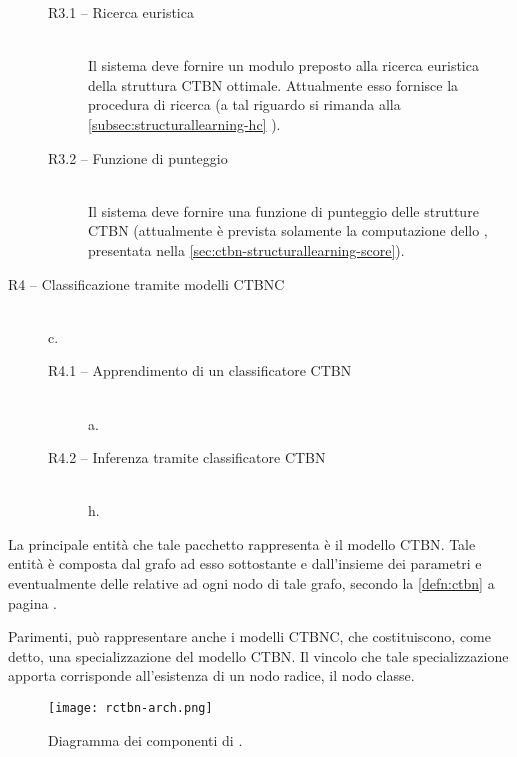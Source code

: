 \begin{description}
		\begin{description}
			\item[R3.1 -- Ricerca euristica] \hfill \\
			Il sistema deve fornire un modulo preposto alla ricerca euristica della struttura \acs{CTBN} ottimale. Attualmente esso fornisce la procedura di ricerca \emph{\keyword{\hc{}}} (a tal riguardo si rimanda alla \autoref{subsec:structurallearning-hc} ).
			\item[R3.2 -- Funzione di punteggio] \hfill \\
			Il sistema deve fornire una funzione di punteggio delle strutture \acs{CTBN} (attualmente è prevista solamente la computazione dello \emph{}, presentata nella \vref{sec:ctbn-structurallearning-score}).
		\end{description}
	\item[R4 -- Classificazione tramite modelli CTBNC] \hfill \\
	c.
		\begin{description}
		\item[R4.1 -- Apprendimento di un classificatore \acs{CTBN}] \hfill \\
		a.
		\item[R4.2 -- Inferenza tramite classificatore \acs{CTBN}] \hfill \\
		h.
		\end{description}
\end{description}

La principale entità che tale pacchetto rappresenta è il modello \acs{CTBN}. Tale entità è composta dal grafo ad esso sottostante e dall'insieme dei parametri e eventualmente delle \im{} relative ad ogni nodo di tale grafo, secondo la \autoref{defn:ctbn} a pagina \pageref{defn:ctbn}.

Parimenti, \rctbn{} può rappresentare anche i modelli \acs{CTBNC}, che costituiscono, come detto, una specializzazione del modello \acs{CTBN}. Il vincolo che tale specializzazione apporta corrisponde all'esistenza di un nodo radice, il nodo classe.




\begin{figure}
	\centering
	\texttt{[image: rctbn-arch.png]}
	\caption[Diagramma dei componenti di \rctbn{}]{Diagramma dei componenti di \rctbn{}.}
	\label{fig:rctbncomponents}
\end{figure}


